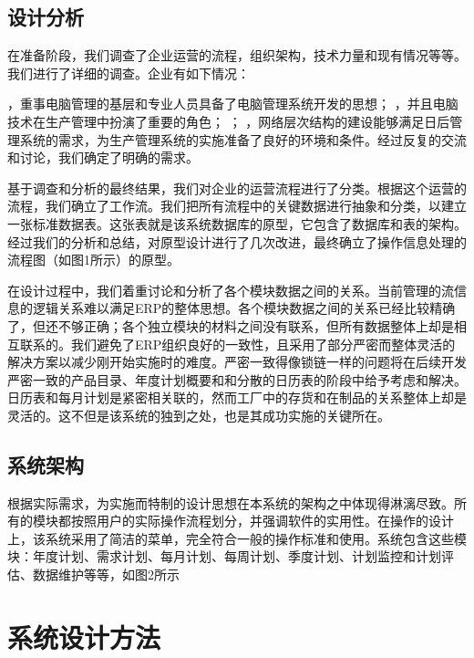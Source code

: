 \subsection{设计分析}

在准备阶段，我们调查了企业运营的流程，组织架构，技术力量和现有情况等等。我们进行了详细的调查。企业有如下情况：
\begin{itemize}
，重事电脑管理的基层和专业人员具备了电脑管理系统开发的思想；
，并且电脑技术在生产管理中扮演了重要的角色；
；
，网络层次结构的建设能够满足日后管理系统的需求，为生产管理系统的实施准备了良好的环境和条件。经过反复的交流和讨论，我们确定了明确的需求。
\end{itemize}

基于调查和分析的最终结果，我们对企业的运营流程进行了分类。根据这个运营的流程，我们确立了工作流。我们把所有流程中的关键数据进行抽象和分类，以建立一张标准数据表。这张表就是该系统数据库的原型，它包含了数据库和表的架构。经过我们的分析和总结，对原型设计进行了几次改进，最终确立了操作信息处理的流程图（如图1所示）的原型。
        
在设计过程中，我们着重讨论和分析了各个模块数据之间的关系。当前管理的流信息的逻辑关系难以满足ERP的整体思想。各个模块数据之间的关系已经比较精确了，但还不够正确；各个独立模块的材料之间没有联系，但所有数据整体上却是相互联系的。我们避免了ERP组织良好的一致性，且采用了部分严密而整体灵活的解决方案以减少刚开始实施时的难度。严密一致得像锁链一样的问题将在后续开发严密一致的产品目录、年度计划概要和和分散的日历表的阶段中给予考虑和解决。日历表和每月计划是紧密相关联的，然而工厂中的存货和在制品的关系整体上却是灵活的。这不但是该系统的独到之处，也是其成功实施的关键所在。

\subsection{系统架构}

根据实际需求，为实施而特制的设计思想在本系统的架构之中体现得淋漓尽致。所有的模块都按照用户的实际操作流程划分，并强调软件的实用性。在操作的设计上，该系统采用了简洁的菜单，完全符合一般的操作标准和使用。系统包含这些模块：年度计划、需求计划、每月计划、每周计划、季度计划、计划监控和计划评估、数据维护等等，如图2所示

\section{系统设计方法}

